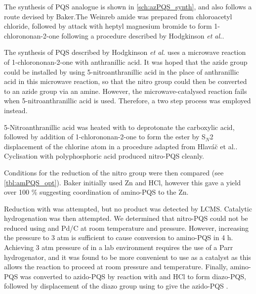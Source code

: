 The synthesis of PQS analogue  is shown in \ref{sch:azPQS_synth}, and also follows a route devised by Baker\cite{Baker2015}.The Weinreb amide \cite{Hodgkinson2011} was prepared from chloroacetyl chloride, followed by attack with heptyl magnesium bromide  to form 1-chlorononan-2-one  following a procedure described by Hodgkinson \textit{et al.}\cite{Hodgkinson2012}. 

The synthesis of PQS described by Hodgkinson \textit{et al.}\cite{Hodgkinson2012} uses a microwave reaction of 1-chlorononan-2-one  with anthranillic acid. It was hoped that the azide group could be installed by using 5-nitroanthranillic acid  in the place of anthranillic acid in this microwave reaction, so that the nitro group could then be converted to an azide group via an amine. However, the microwave-catalysed reaction fails when 5-nitroanthranillic acid  is used\cite{Baker2015}. Therefore, a two step process was employed instead. 

5-Nitroanthranillic acid  was heated with  to deprotonate the carboxylic acid, followed by addition of 1-chlorononan-2-one  to form the ester  by S$_N$2 displacement of the chlorine atom in a procedure adapted from Hlav\'a\u c et al.\cite{Hlavac2004}. Cyclisation with polyphosphoric acid produced nitro-PQS  cleanly\cite{Hlavac2004,Hradil1999}. 

Conditions for the reduction of the nitro group were then compared (see \ref{tbl:amPQS_opt}). Baker initially used Zn and HCl, however this gave a yield over 100 \% suggesting coordination of amino-PQS  to the Zn\cite{Baker2015}. 

Reduction with  was attempted, but no product was detected by LCMS. Catalytic hydrogenation was then attempted. We determined that nitro-PQS  could not be reduced using  and Pd/C at room temperature and pressure. However, increasing the pressure to 3 atm is sufficient to cause conversion to amino-PQS  in 4 h. Achieving 3 atm pressure of  in a lab environment requires the use of a Parr hydrogenator, and it was found to be more convenient to use  as a catalyst as this allows the reaction to proceed at room pressure and temperature\cite{Shen2006a}. Finally, amino-PQS  was converted to azido-PQS  by reaction with  and HCl to form diazo-PQS, followed by displacement of the diazo group using  to give the azido-PQS \cite{Xu2013}.

